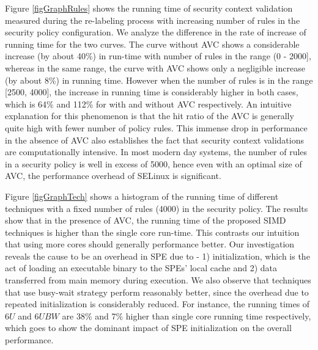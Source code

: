 \documentclass[conference]{IEEEtran}
\begin{document}
Figure \ref{figGraphRules} shows the running time of security context validation measured during the re-labeling process with increasing number of rules in the security policy configuration.
We analyze the difference in the rate of increase of
running time for the two curves. The curve without AVC shows a considerable increase (by about 40\%) in run-time with 
number of rules in the range (0 - 2000], whereas in the same range,
the curve with AVC shows only a negligible increase (by about 8\%) in running time. However when the number of rules is in the range [2500, 4000], the
increase in running time is considerably higher in both cases, which is 64\% and 112\% for with and without AVC respectively. An intuitive explanation for this phenomenon is that the hit ratio of the AVC is generally quite high with fewer number of policy rules. This immense drop in performance in the absence of AVC also establishes the fact that security context validations are computationally intensive. In most modern day systems, the number of
rules in a security policy is well in excess of 5000, hence even with an optimal size of 
AVC, the performance overhead of SELinux is significant.

Figure \ref{figGraphTech} shows a histogram of the running time of different 
techniques with a fixed number of rules (4000) in the security policy. The results show that in the presence of AVC,  the running time of the proposed
SIMD techniques is higher than the single core run-time. This contrasts our intuition that using more cores should generally performance better. Our investigation reveals the cause to be an overhead in SPE due to - 1) initialization, which is the act of loading an executable binary to the SPEs' local cache and 2) data transferred from main memory during execution. We also observe that techniques that use busy-wait strategy perform reasonably better, since the overhead due to repeated initialization is considerably reduced.  For instance, the running
times of $6U$ and $6UBW$ are 38\% and 7\% higher than single core
running time respectively, which goes to show the dominant impact of
SPE initialization on the overall performance.
\end{document}
